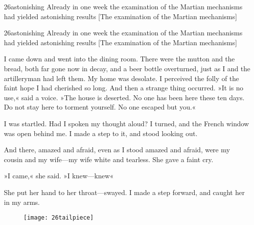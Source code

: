 
\begin{letter}
	\begin{bwbigpic}
		[1.2] 
		{26astonishing} 
		{Already in one week the examination of the Martian mechanisms had yielded astonishing results} 
		[The examination of the Martian mechanisms]
	\end{bwbigpic}

\end{letter}

\begin{a4}
	\begin{bwbigpic}
		[1.1] 
		{26astonishing} 
		{Already in one week the examination of the Martian mechanisms had yielded astonishing results} 
		[The examination of the Martian mechanisms]
	\end{bwbigpic}

\end{a4}

I came down and went into the dining room. There were the mutton and the bread, both far gone now in decay, and a beer bottle overturned, just as I and the artilleryman had left them. My home was desolate. I perceived the folly of the faint hope I had cherished so long. And then a strange thing occurred. »It is no use,« said a voice. »The house is deserted. No one has been here these ten days. Do not stay here to torment yourself. No one escaped but you.«

I was startled. Had I spoken my thought aloud? I turned, and the French window was open behind me. I made a step to it, and stood looking out.

And there, amazed and afraid, even as I stood amazed and afraid, were my cousin and my wife—my wife white and tearless. She gave a faint cry.

»I came,« she said. »I knew—knew\longdash«

She put her hand to her throat—swayed. I made a step forward, and caught her in my arms.

\begin{figure}[b!]
\centering
\texttt{[image: 26tailpiece]}
\end{figure}
